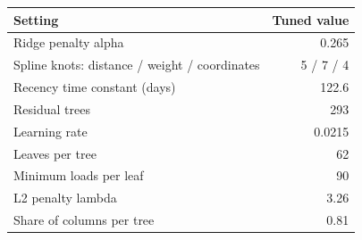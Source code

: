\begin{tabular}{lr}
\toprule
Setting & Tuned value \\
\midrule
Ridge penalty alpha & 0.265 \\
Spline knots: distance / weight / coordinates & 5 / 7 / 4 \\
Recency time constant (days) & 122.6 \\
Residual trees & 293 \\
Learning rate & 0.0215 \\
Leaves per tree & 62 \\
Minimum loads per leaf & 90 \\
L2 penalty lambda & 3.26 \\
Share of columns per tree & 0.81 \\
\bottomrule
\end{tabular}
